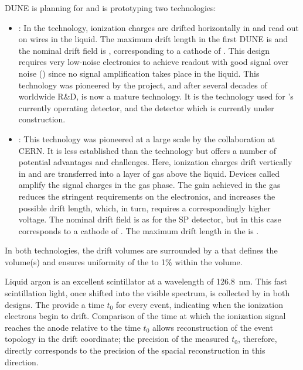 DUNE is planning for and is prototyping two  technologies:
\begin{itemize}
\item {}: In the  technology, ionization charges are drifted horizontally in  and read out on wires in the liquid.  The maximum drift length in the first DUNE  is \spmaxdrift and the nominal drift field is \spmaxfield, corresponding to a cathode  of \sptargetdriftvoltpos. This design requires very low-noise electronics to achieve readout with good signal over noise () since no signal amplification takes place in the liquid. This technology was pioneered by the  project, and after several decades of worldwide R\&D, is now a mature technology. It is the technology used for 's currently operating  detector, and the  detector which is currently under construction. 

\item {}: This technology was pioneered at a large scale by the  collaboration at CERN. It is less established than the  technology but offers a number of potential advantages and challenges. Here, ionization charges drift vertically in  and are transferred into a layer of gas above the liquid. Devices called  amplify the signal charges  in the gas phase. The gain achieved in the gas reduces the stringent requirements on the electronics, and increases the possible drift length, which, in turn, requires a correspondingly higher voltage. The nominal drift field is \dpnominaldriftfield as for the SP detector, but in this case corresponds to a cathode  of \dptargetdriftvoltpos.
The maximum drift length in the  is \dpmaxdrift{}.  
\end{itemize}
In both technologies, the drift volumes are surrounded by a  that defines the volume(s) and ensures uniformity of the \efield to 1\% within the volume.

Liquid argon is an excellent scintillator at a wavelength of \SI{126.8}{\nano\meter}. This fast scintillation light, once shifted into the visible spectrum, is collected by  in both designs. The  provide a time $t_{0}$ for every event, indicating when the ionization electrons begin to drift. Comparison of the time at which the ionization signal reaches the anode relative to the time $t_{0}$ allows reconstruction of the event topology in the drift coordinate; the precision of the measured $t_{0}$, therefore, directly corresponds to the precision of the spacial reconstruction in this direction. 

